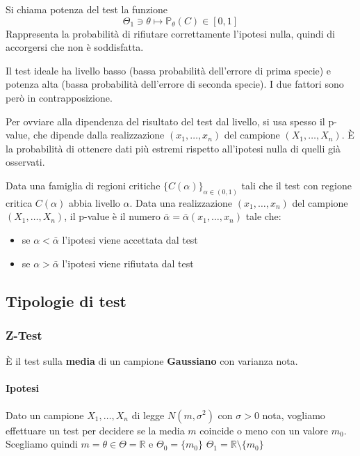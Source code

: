 \begin{definition}
	Si chiama potenza del test la funzione
	\begin{equation}
		\Theta_1 \ni \theta \mapsto \mathbb{P}_\theta(C) \in [0,1]
	\end{equation}
	Rappresenta la probabilità di rifiutare correttamente l'ipotesi nulla, quindi di accorgersi che non è soddisfatta.
\end{definition}

\begin{observation}
	Il test ideale ha livello basso (bassa probabilità dell'errore di prima specie) e potenza alta (bassa probabilità dell'errore di seconda specie). I due fattori sono però in contrapposizione.
\end{observation}

Per ovviare alla dipendenza del risultato del test dal livello, si usa spesso il p-value, che dipende dalla realizzazione $(x_1, \ldots, x_n)$ del campione $(X_1, \ldots, X_n)$. È la probabilità di ottenere dati più estremi rispetto all'ipotesi nulla di quelli già osservati.

\begin{definition}[p-value]
	Data una famiglia di regioni critiche $\{C(\alpha)\}_{\alpha \in (0,1)}$ tali che il test con regione critica $C(\alpha)$ abbia livello $\alpha$. Data una realizzazione $(x_1, \ldots, x_n)$ del campione $(X_1, \ldots, X_n)$, il p-value è il numero $\bar{\alpha}=\bar{\alpha}(x_1, \ldots, x_n)$ tale che:
	\begin{itemize}
		\item se $\alpha < \bar{\alpha}$ l'ipotesi viene accettata dal test 
		\item se $\alpha > \bar{\alpha}$ l'ipotesi viene rifiutata dal test
	\end{itemize}
\end{definition}

\subsection{Tipologie di test}
\subsubsection{Z-Test}
È il test sulla \textbf{media} di un campione \textbf{Gaussiano} con varianza nota.

\paragraph{Ipotesi}
Dato un campione $X_1, \ldots, X_n$ di legge $N(m, \sigma^2)$ con $\sigma > 0$ nota, vogliamo effettuare un test per decidere se la media $m$ coincide o meno con un valore $m_0$. Scegliamo quindi $m = \theta \in \Theta = \mathbb{R}$ e $\Theta_0 = \{m_0\}$ $\Theta_1 = \mathbb{R} \setminus \{m_0\}$